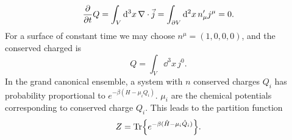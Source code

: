 \begin{equation*}
    \pdv{t} Q = \int_V \dd^3 x \, \nabla \cdot \vec j = \int_{\partial V} \dd^2 x\, n'_\mu j^\mu = 0.
\end{equation*}
For a surface of constant time we may choose $n^\mu = (1, 0, 0, 0)$, and the conserved charged is
\begin{equation*}
    Q = \int_V \dd^3 x \, j^0.
\end{equation*}
In the grand canonical ensemble, a system with $n$ conserved charges $Q_i$ has probability proportional to $e^{-\beta (H - \mu_i Q_i)}$.
$\mu_i$ are the chemical potentials corresponding to conserved charge $Q_i$.
This leads to the partition function
\begin{equation}
    Z = \Tr{e^{-\beta(\hat H - \mu_i \hat Q_i)}}.
\end{equation}

